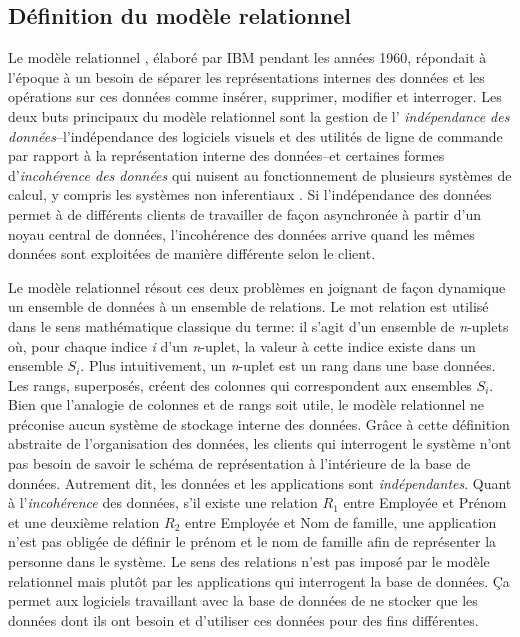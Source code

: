 \documentclass{article}
\begin{document}
\subsection{Définition du modèle relationnel}\label{sec:definition}
Le modèle relationnel \cite{codd1970relational}, élaboré par IBM pendant les
années 1960, répondait à l'époque à un besoin de séparer les
représentations internes des données et les opérations sur ces données comme
insérer, supprimer, modifier et interroger. Les deux buts principaux du
modèle relationnel sont la gestion de l'\og{} \emph{indépendance des
données}--l'indépendance des logiciels visuels et des utilités de ligne de commande
par rapport à la représentation interne des données--et certaines formes
d'\emph{incohérence des données} qui nuisent au fonctionnement de plusieurs
systèmes de calcul, y compris les systèmes non inferentiaux\fg{}
\cite[p.377]{codd1970relational}. Si l'indépendance des données permet à
de différents clients de travailler de façon asynchronée
à partir d'un noyau central de données,
l'incohérence des données arrive quand les mêmes données sont exploitées de
manière différente selon le client.\par
Le modèle relationnel résout ces deux problèmes en joignant de façon
dynamique un ensemble de données
à un ensemble de relations. Le mot \og{}relation\fg{} est utilisé dans le sens
mathématique classique du terme: il s'agit d'un ensemble de \emph{n}-uplets où, pour
chaque indice \emph{i} d'un \emph{n}-uplet, la valeur à cette indice existe dans
un ensemble $S_{i}$. Plus intuitivement, un \emph{n}-uplet est un rang dans
une base données. Les rangs, superposés, créent des colonnes qui
correspondent aux ensembles $S_{i}$. Bien que l'analogie de colonnes et de
rangs soit utile, le modèle relationnel ne préconise aucun système de
stockage interne des données. Grâce à cette définition abstraite de
l'organisation des données, les clients qui interrogent le système
n'ont pas besoin de savoir le schéma de représentation à
l'intérieure de la base de données.  Autrement dit, les données et les
applications sont \emph{indépendantes}. Quant à l'\emph{incohérence} des
données, s'il existe une relation 
$R_{1}$ entre Employée et Prénom et une deuxième relation $R_{2}$
entre Employée et Nom de famille, une application n'est pas obligée de
définir le prénom et le nom de famille afin de représenter la personne dans
le système. Le sens des relations n'est pas imposé par le modèle
relationnel mais plutôt par les applications qui interrogent la base de données. Ça
permet aux logiciels travaillant avec la base de données de ne stocker que les
données dont ils ont besoin et d'utiliser ces données pour des fins
différentes.
\end{document}
